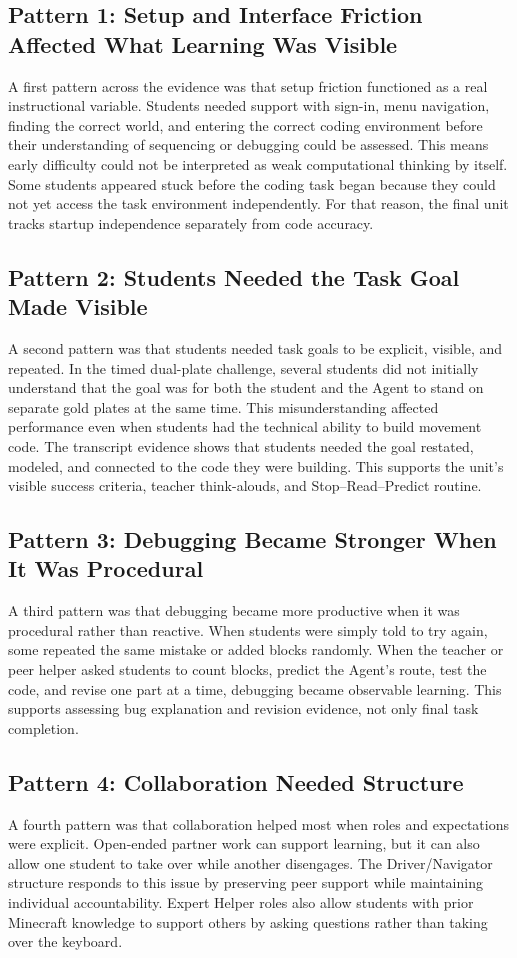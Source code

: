 \documentclass[12pt]{article}
\begin{document}
\subsection{Pattern 1: Setup and Interface Friction Affected What Learning Was Visible}
A first pattern across the evidence was that setup friction functioned as a real instructional variable. Students needed support with sign-in, menu navigation, finding the correct world, and entering the correct coding environment before their understanding of sequencing or debugging could be assessed. This means early difficulty could not be interpreted as weak computational thinking by itself. Some students appeared stuck before the coding task began because they could not yet access the task environment independently. For that reason, the final unit tracks startup independence separately from code accuracy.

\subsection{Pattern 2: Students Needed the Task Goal Made Visible}
A second pattern was that students needed task goals to be explicit, visible, and repeated. In the timed dual-plate challenge, several students did not initially understand that the goal was for both the student and the Agent to stand on separate gold plates at the same time. This misunderstanding affected performance even when students had the technical ability to build movement code. The transcript evidence shows that students needed the goal restated, modeled, and connected to the code they were building. This supports the unit's visible success criteria, teacher think-alouds, and Stop--Read--Predict routine.

\subsection{Pattern 3: Debugging Became Stronger When It Was Procedural}
A third pattern was that debugging became more productive when it was procedural rather than reactive. When students were simply told to try again, some repeated the same mistake or added blocks randomly. When the teacher or peer helper asked students to count blocks, predict the Agent's route, test the code, and revise one part at a time, debugging became observable learning. This supports assessing bug explanation and revision evidence, not only final task completion.

\subsection{Pattern 4: Collaboration Needed Structure}
A fourth pattern was that collaboration helped most when roles and expectations were explicit. Open-ended partner work can support learning, but it can also allow one student to take over while another disengages. The Driver/Navigator structure responds to this issue by preserving peer support while maintaining individual accountability. Expert Helper roles also allow students with prior Minecraft knowledge to support others by asking questions rather than taking over the keyboard.
\end{document}
